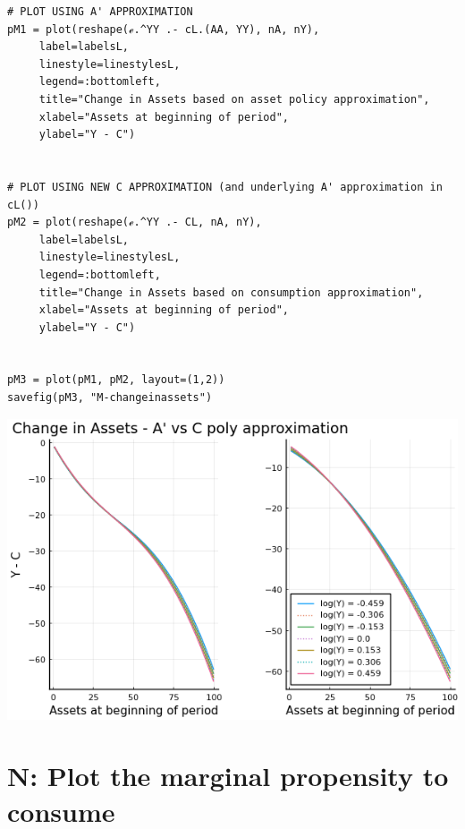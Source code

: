 \documentclass[12pt]{article}
\begin{document}
\begin{lstlisting}[language=JuliaLocal, style=julia]
# PLOT USING A' APPROXIMATION
pM1 = plot(reshape(ℯ.^YY .- cL.(AA, YY), nA, nY),
     label=labelsL,
     linestyle=linestylesL,
     legend=:bottomleft,
     title="Change in Assets based on asset policy approximation",
     xlabel="Assets at beginning of period",
     ylabel="Y - C")


# PLOT USING NEW C APPROXIMATION (and underlying A' approximation in cL())
pM2 = plot(reshape(ℯ.^YY .- CL, nA, nY),
     label=labelsL,
     linestyle=linestylesL,
     legend=:bottomleft,
     title="Change in Assets based on consumption approximation",
     xlabel="Assets at beginning of period",
     ylabel="Y - C")


pM3 = plot(pM1, pM2, layout=(1,2))
savefig(pM3, "M-changeinassets")
\end{lstlisting}

\includegraphics[]{problem sets/ps8/M-changeinassets.png}








\newpage
\section*{N: Plot the marginal propensity to consume}
\end{document}
